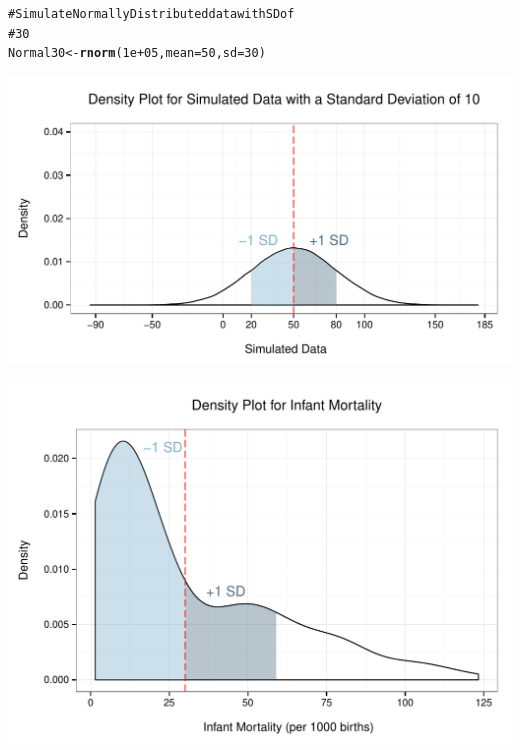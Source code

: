 \documentclass{beamer}\usepackage{graphicx, color}
\makeatletter
\def\maxwidth{ %
  \ifdim\Gin@nat@width>\linewidth
    \linewidth
  \else
    \Gin@nat@width
  \fi
}
\newcommand{\hlfunctioncall}[1]{\textcolor[rgb]{0.501960784313725,0,0.329411764705882}{\textbf{#1}}}%
\newcommand{\hlcomment}[1]{\textcolor[rgb]{0.180392156862745,0.6,0.341176470588235}{#1}}%
\newenvironment{kframe}{%
 \def\at@end@of@kframe{}%
 \ifinner\ifhmode%
  \def\at@end@of@kframe{\end{minipage}}%
  \begin{minipage}{\columnwidth}%
 \fi\fi%
 \def\FrameCommand##1{\hskip\@totalleftmargin \hskip-\fboxsep
 \colorbox{shadecolor}{##1}\hskip-\fboxsep
     \hskip-\linewidth \hskip-\@totalleftmargin \hskip\columnwidth}%
 \MakeFramed {\advance\hsize-\width
   \@totalleftmargin\z@ \linewidth\hsize
   \@setminipage}}%
 {\par\unskip\endMakeFramed%
 \at@end@of@kframe}
\newenvironment{knitrout}{}{} %
\makeatother
\begin{document}
\begin{frame}[fragile]
\begin{knitrout}
\color{fgcolor}\begin{kframe}
\begin{alltt}
\hlcomment{# Simulate Normally Distributed data with SD of}
\hlcomment{# 30}
Normal30 <- \hlfunctioncall{rnorm}(1e+05, mean = 50, sd = 30)
\end{alltt}
\end{kframe}
\end{knitrout}


\begin{knitrout}
\color{fgcolor}

{\centering \includegraphics[width=\maxwidth]{figure/SDNormal30} 

}


\end{knitrout}

\end{frame}


\begin{frame}[fragile]
\begin{knitrout}
\color{fgcolor}

{\centering \includegraphics[width=\maxwidth]{figure/SDMort} 

}


\end{knitrout}

\end{frame}
\end{document}
